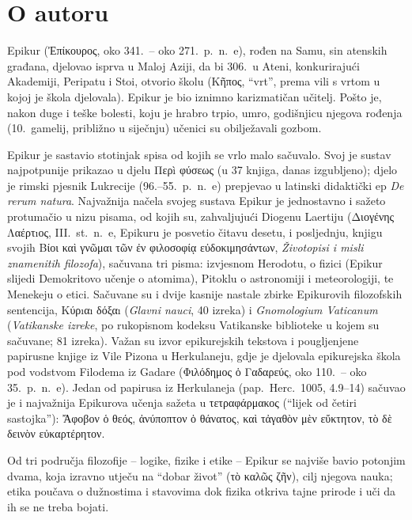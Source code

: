 \section*{O autoru}

Epikur \textgreek[variant=ancient]{(Ἐπίκουρος,} oko 341.\ – oko 271.\ p.~n.~e), rođen na Samu, sin atenskih građana, djelovao isprva u Maloj Aziji, da bi 306.\ u Ateni, konkurirajući Akademiji, Peripatu i Stoi, otvorio školu \textgreek[variant=ancient]{(Κῆπος,} ``vrt'', prema vili s vrtom u kojoj je škola djelovala). Epikur je bio iznimno karizmatičan učitelj. Pošto je, nakon duge i teške bolesti, koju je hrabro trpio, umro, godišnjicu njegova rođenja (10.\ gamelij, približno u siječnju) učenici su obilježavali gozbom.

Epikur je sastavio stotinjak spisa od kojih se vrlo malo sačuvalo. Svoj je sustav najpotpunije prikazao u djelu \textgreek[variant=ancient]{Περì φύσεως} (u 37 knjiga, danas izgubljeno); djelo je rimski pjesnik Lukrecije (96.–55.\ p.~n.~e) prepjevao u latinski didaktički ep \textit{De rerum natura}. Najvažnija načela svojeg sustava Epikur je jednostavno i sažeto protumačio u nizu pisama, od kojih su, zahvaljujući Diogenu Laertiju \textgreek[variant=ancient]{(Διογένης Λαέρτıος,} III.~st.\ n.~e, Epikuru je posvetio čitavu desetu, i posljednju, knjigu svojih \textgreek[variant=ancient]{Βίοι καὶ γνῶμαι τῶν ἐν φιλοσοφίᾳ εὐδοκιμησάντων,} \textit{Životopisi i misli znamenitih filozofa}), sačuvana tri pisma: izvjesnom Herodotu, o fizici (Epikur slijedi Demokritovo učenje o atomima), Pitoklu o astronomiji i meteorologiji, te Menekeju o etici. Sačuvane su i dvije kasnije nastale zbirke Epikurovih filozofskih sentencija, \textgreek[variant=ancient]{Κύρıαı δόξαı} (\textit{Glavni nauci}, 40 izreka) i \textit{Gnomologium Vaticanum} (\textit{Vatikanske izreke}, po rukopisnom kodeksu Vatikanske biblioteke u kojem su sačuvane; 81 izreka). Važan su izvor epikurejskih tekstova i pougljenjene papirusne knjige iz Vile Pizona u Herkulaneju, gdje je djelovala epikurejska škola pod vodstvom Filodema iz Gadare \textgreek[variant=ancient]{(Φιλόδημος ὁ Γαδαρεύς,} oko 110.\ – oko 35.\ p.~n.~e). Jedan od papirusa iz Herkulaneja (pap.\ Herc.\ 1005, 4.9–14) sačuvao je i najvažnija Epikurova učenja sažeta u τετραφάρμακος (``lijek od četiri sastojka''): \textgreek[variant=ancient]{Ἄφοβον ὁ θεός, ἀνύποπτον ὁ θάνατος, καὶ τἀγαθὸν μὲν εὔκτητον, τὸ δὲ δεινὸν εὐκαρτέρητον.}

Od tri područja filozofije – logike, fizike i etike – Epikur se najviše bavio potonjim dvama, koja izravno utječu na ``dobar život'' \textgreek[variant=ancient]{(τὸ καλῶς ζῆν),} cilj njegova nauka; etika poučava o dužnostima i stavovima dok fizika otkriva tajne prirode i uči da ih se ne treba bojati. 


